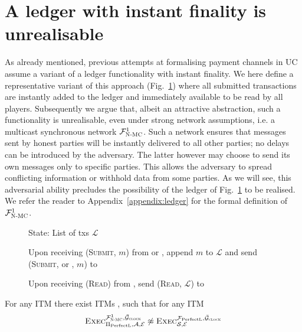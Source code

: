 \section{A ledger with instant finality is unrealisable}
\label{sec:perfect-ledger}
  As already mentioned, previous attempts at formalising payment channels in
  UC~\cite{DBLP:conf/ccs/DziembowskiFH18,perun,Malavolta:2017:CPP:3133956.3134096,sprites}
  assume a variant of a ledger functionality with instant finality. We here
  define a representative variant of this approach \perfectledger{}
  (Fig.~\ref{fig:perfectledger:func}) where all submitted transactions are
  instantly added to the ledger and immediately available to be read by all
  players. Subsequently we argue that, albeit an attractive abstraction, such a
  functionality is unrealisable, even under strong network assumptions, i.e. a
  multicast synchronous network $\mathcal{F}_{\textsc{N-MC}}^1$.
  Such a network ensures that messages sent by honest parties will be instantly
  delivered to all other parties; no delays can be introduced by the adversary.
  The latter however may choose to send its own messages only to specific
  parties. This allows the adversary to spread conflicting information or
  withhold data from some parties. As we will see, this adversarial ability
  precludes the possibility of the ledger of Fig.~\ref{fig:perfectledger:func}
  to be realised. We refer the reader to Appendix~\ref{appendix:ledger} for the
  formal definition of $\mathcal{F}_{\textsc{N-MC}}^1$.

  \begin{figure}[H]
    \begin{systembox}{\perfectledger}
      \begin{algorithmic}[1]
        \State State: List of txs $\mathcal{L}$
        \Statex

        \State Upon receiving (\textsc{Submit}, $m$) from \alice{} or
        \adversary, append $m$ to $\mathcal{L}$ and send (\textsc{Submit},
        \alice{} or \adversary, $m$) to \adversary
        \Statex

        \State Upon receiving (\textsc{Read}) from \alice, send (\textsc{Read},
        $\mathcal{L}$) to \alice
      \end{algorithmic}
    \end{systembox}
    \caption{}
    \label{fig:perfectledger:func}
  \end{figure}

  \begin{theorem}
    \label{theorem:perfectledger}
    For any ITM \perfectprot{} there exist ITMs \perfectenv,
    \perfectadv{} such that for any ITM \simulator
    \begin{equation*}
      \textsc{Exec}^{\mathcal{F}_{\textsc{N-MC}}^1, \bar{\mathcal{G}}_{\textsc{clock}}}_{\Pi_{\mathrm{PerfectL}}, \mathcal{A},
      \mathcal{E}} \not\approx \textsc{Exec}^{\mathcal{F}_{\mathrm{PerfectL}},
      \bar{\mathcal{G}}_{\textsc{clock}}}_{\mathcal{S}, \mathcal{E}}
    \end{equation*}
  \end{theorem}

